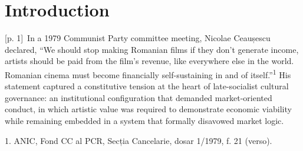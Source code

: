 \documentclass[10pt,a4paper]{article}
\begin{document}
\section*{Introduction}
{\scriptsize\color{gray} [p. 1]}\ In a 1979 Communist Party committee meeting, Nicolae Ceaușescu declared, “We should stop making Romanian films if they don’t generate income, artists should be paid from the film’s revenue, like everywhere else in the world. Romanian cinema must become financially self-sustaining in and of itself.”\nobreak\textsuperscript{1} His statement captured a constitutive tension at the heart of late-socialist cultural governance: an institutional configuration that demanded market-oriented conduct, in which artistic value was required to demonstrate economic viability while remaining embedded in a system that formally disavowed market logic.\par{\small 1. ANIC, Fond CC al PCR, Secția Cancelarie, dosar 1/1979, f. 21 (verso).\par}
\end{document}
